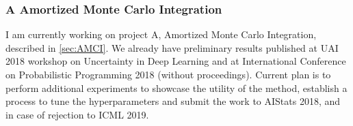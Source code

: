 \documentclass[12pt]{article}
\begin{document}
\subsubsection*{A \quad Amortized Monte Carlo Integration}
I am currently working on project A, Amortized Monte Carlo Integration, described in \autoref{sec:AMCI}.
We already have preliminary results published at UAI 2018 workshop on Uncertainty in Deep Learning \citep{golinski2018uai} and at International Conference on Probabilistic Programming 2018 \citep{golinski2018probprog} (without proceedings).
Current plan is to perform additional experiments to showcase the utility of the method, establish a process to tune the hyperparameters and submit the work to AIStats 2018, and in case of rejection to ICML 2019.
 
\end{document}
